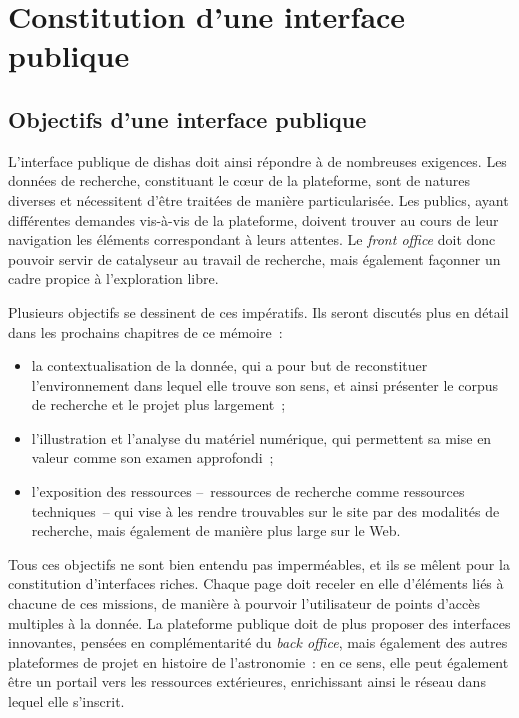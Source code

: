 \documentclass[a4paper,12pt,twoside]{book}
\newcommand{\eng}{\emph}
\newcommand{\dishas}{\gls{dishas}\xspace}
\begin{document}
	\section{Constitution d'une interface publique}
		\subsection{Objectifs d'une interface publique}
L'interface publique de \dishas doit ainsi répondre à de nombreuses exigences. Les données de recherche, constituant le cœur de la plateforme, sont de natures diverses et nécessitent d'être traitées de manière particularisée. Les publics, ayant différentes demandes vis-à-vis de la plateforme, doivent trouver au cours de leur navigation les éléments correspondant à leurs attentes. Le \eng{front office} doit donc pouvoir servir de catalyseur au travail de recherche, mais également façonner un cadre propice à l'exploration libre.

Plusieurs objectifs se dessinent de ces impératifs. Ils seront discutés plus en détail dans les prochains chapitres de ce mémoire~:
\begin{itemize}
	\item la contextualisation de la donnée, qui a pour but de reconstituer l'environnement dans lequel elle trouve son sens, et ainsi présenter le corpus de recherche et le projet plus largement~;
	\item l'illustration et l'analyse du matériel numérique, qui permettent sa mise en valeur comme son examen approfondi~;
	\item l'exposition des ressources –~ressources de recherche comme ressources techniques~– qui vise à les rendre trouvables sur le site par des modalités de recherche, mais également de manière plus large sur le Web.
\end{itemize}

Tous ces objectifs ne sont bien entendu pas imperméables, et ils se mêlent pour la constitution d'interfaces riches. Chaque page doit receler en elle d'éléments liés à chacune de ces missions, de manière à pourvoir l'utilisateur de points d'accès multiples à la donnée. La plateforme publique doit de plus proposer des interfaces innovantes, pensées en complémentarité du \eng{back office}, mais également des autres plateformes de projet en histoire de l'astronomie~: en ce sens, elle peut également être un portail vers les ressources extérieures, enrichissant ainsi le réseau dans lequel elle s'inscrit.
\end{document}
